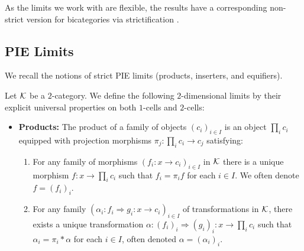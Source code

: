 As the limits we work with are flexible, the results have a corresponding non-strict version for bicategories via strictification \cite{birdFlexibleLimits2categories1989, GordonPowerStreet1995CoherenceTricategories}.

\subsection{PIE Limits}
We recall the notions of strict PIE limits (products, inserters, and equifiers).
\begin{definition}
   Let $\mathcal{K}$ be a $2$-category. We define the following $2$-dimensional limits by their explicit universal properties on both $1$-cells and $2$-cells:
   \begin{itemize}
       \item \textbf{Products:} The product of a family of objects $(c_i)_{i \in I}$ is an object $\prod_i c_i$ equipped with projection morphisms $\pi_j \colon \prod_i c_i \to c_j$ satisfying:
       \begin{enumerate}[label=(\roman*)]
           \item For any family of morphisms $(f_i\colon x\to c_i)_{i\in I}$ in $\mathcal{K}$ there is a unique morphism $f\colon x\to \prod_i c_i$ such that $f_i = \pi_i f$ for each $i\in I$. We often denote $f = (f_i)_i$.
           \item For any family $(\alpha_i\colon f_i\Rightarrow g_i\colon x\to c_i)_{i\in I}$ of transformations in $\mathcal{K}$, there exists a unique transformation $\alpha\colon (f_i)_i\Rightarrow (g_i)_i\colon x\to \prod_i c_i$ such that $\alpha_i = \pi_i* \alpha$ for each $i\in I$, often denoted $\alpha = (\alpha_i)_i$.
       \end{enumerate}


\end{itemize}
\end{definition}
